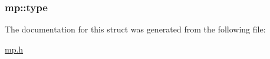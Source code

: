 \subsubsection[{\texorpdfstring{type}{type}}]{ mp\+::type}\hypertarget{structmp_a08cf79f94b4dcfce588ccb41f90cbe0e}{}\label{structmp_a08cf79f94b4dcfce588ccb41f90cbe0e}


The documentation for this struct was generated from the following file\+:\begin{DoxyCompactItemize}
\item 
\hyperlink{mp_8h}{mp.\+h}\end{DoxyCompactItemize}
